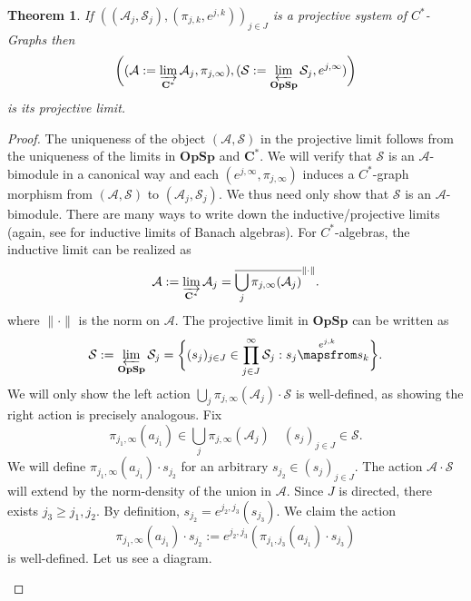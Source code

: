 \documentclass[12pt]{article}
\newtheorem{theorem}{Theorem}[section]
\theoremstyle{definition}
\newcommand{\mc}[1]{\mathcal{#1}}
\newcommand{\<}{\langle}
\renewcommand{\>}{\rangle}
\begin{document}
\begin{theorem} \label{thm: c*graphlimit}
    If $((\mc A_j, \mc S_j),(\pi_{j,k},e^{j,k}))_{j \in J}$ is a projective system of $C^*$-Graphs then
    \[
   \bigg((\mc A := \varinjlim_{\mathbf{C^*}} \mc A_j, \pi_{j,\infty}), (\mc S := \varprojlim_{\mathbf{OpSp}} \mc S_j, e^{j, \infty})\bigg)
    \]
    is its projective limit. 
\end{theorem}
\begin{proof}
    The uniqueness of the object $(\mc A,\mc S)$ in the projective limit follows from the uniqueness of the limits in $\mathbf{OpSp}$ and $\mathbf{C^*}$. We will verify that $\mc S$ is an $\mc A$-bimodule in a canonical way and each $(e^{j,\infty}, \pi_{j,\infty})$ induces a $C^*$-graph morphism from $(\mc A,\mc S)$ to $(\mc A_j,\mc S_j)$. We thus need only show that $\mc S$ is an $\mc A$-bimodule. There are many ways to write down the inductive/projective limits (again, see \cite{Daws-Limits} for inductive limits of Banach algebras). For $C^*$-algebras, the inductive limit can be realized as
    \[
    \mc A:= \varinjlim_{\mathbf{C^*}} \mc A_j  = \overline{\bigcup_j \pi_{j,\infty}(\mc A_j)}^{\|\cdot\|}.
    \]
    where $\|\cdot \|$ is the norm on $\mc A$. The projective limit in $\mathbf{OpSp}$ can be written as
    \[
    \mc S :=  \varprojlim_{\mathbf{OpSp}} \mc S_j = \bigg\{(s_j)_{j \in J} \in \prod_{j \in J}^\infty \mc S_j: s_j \overset{e^{j,k}}{\mapsfrom} s_k\bigg\}.
    \]
    We will only show the left action $\bigcup_j \pi_{j,\infty}(\mc A_j) \cdot \mc S$ is well-defined, as showing the right action is precisely analogous. Fix
    \[
    \pi_{j_1,\infty}(a_{j_1}) \in \bigcup_j \pi_{j,\infty}(\mc A_j) \quad (s_j)_{j \in J} \in \mc S.
    \]
    We will define $\pi_{j_1,\infty}(a_{j_1}) \cdot s_{j_2}$ for an arbitrary $ s_{j_2} \in (s_j)_{j \in J}$. The action $\mc A \cdot \mc S$ will extend by the norm-density of the union in $\mc A$. Since $J$ is directed, there exists $j_3 \geq j_1, j_2$. By definition, $s_{j_2} = e^{j_2, j_3}(s_{j_3})$. We claim the action
    \[
    \pi_{j_1,\infty}(a_{j_1}) \cdot s_{j_2} :=  e^{j_2, j_3}(\pi_{j_1, j_3}(a_{j_1}) \cdot s_{j_3})
    \]
    is well-defined. Let us see a diagram. 
    \begin{center}
\end{center}
\end{proof}
\end{document}
